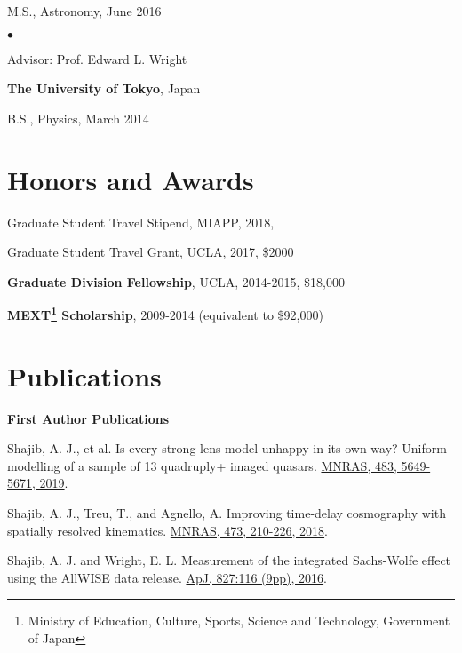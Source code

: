 \documentclass[margin, line]{res}
\newenvironment{list1}{
  \begin{list}{\ding{113}}{%
      \setlength{\itemsep}{0in}
      \setlength{\parsep}{0in} \setlength{\parskip}{0in}
      \setlength{\topsep}{0in} \setlength{\partopsep}{0in} 
      \setlength{\leftmargin}{0.17in}}}{\end{list}}
\newenvironment{list2}{
  \begin{list}{$\bullet$}{%
      \setlength{\itemsep}{0in}
      \setlength{\parsep}{0in} \setlength{\parskip}{0in}
      \setlength{\topsep}{0in} \setlength{\partopsep}{0in} 
      \setlength{\leftmargin}{0.2in}}}{\end{list}}
\begin{document}
\begin{resume}
\begin{list1}
	\item[] M.S., Astronomy,  June 2016
	\begin{list2}
		\vspace*{.05in} 
		\item Advisor:  Prof. Edward L. Wright
	\end{list2}
\end{list1}

{\bf The University of Tokyo}, Japan\\
\vspace*{-.1in}
\begin{list1}
\item[] B.S., Physics,  March 2014
\end{list1}


\section{\sc Honors and Awards} 
Graduate Student Travel Stipend, {MIAPP}, 2018, 

\vspace*{-2.5mm}
Graduate Student Travel Grant, {UCLA}, 2017, \$2000

\vspace*{-2.5mm}
\textbf{Graduate Division Fellowship}, UCLA, 2014-2015, \$18,000

\vspace*{-2.5mm}
\textbf{MEXT\footnote{Ministry of Education, Culture, Sports, Science and Technology, Government of Japan} Scholarship}, 2009-2014 (equivalent to \$92,000)


\section{\sc Publications}
\textbf{First Author Publications} \\
\begin{etaremune}
	\item {Shajib, A. J.}, et al. Is every strong lens model unhappy in its own way? Uniform modelling of a sample of 13 quadruply+ imaged quasars. \href{https://doi.org/10.1093/mnras/sty3397}{MNRAS, 483, 5649-5671, 2019}.
	\item {Shajib, A. J.}, Treu, T., and Agnello, A. Improving time-delay cosmography with spatially resolved kinematics. \href{https://doi.org/10.1093/mnras/stx2302}{MNRAS, 473, 210-226, 2018}.
	\item {Shajib, A. J.} and Wright, E. L. Measurement of the integrated Sachs-Wolfe effect using the AllWISE data release. \href{http://dx.doi.org/10.3847/0004-637X/827/2/116}{ApJ, 827:116 (9pp), 2016}.
\end{etaremune}



\end{resume}
\end{document}
